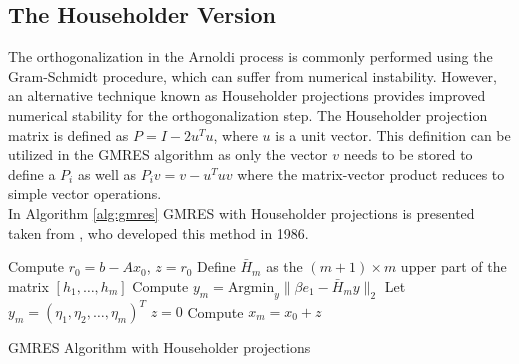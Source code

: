 \documentclass{article}
\begin{document}
\subsection{The Householder Version}
The orthogonalization in the Arnoldi process is commonly performed using the Gram-Schmidt procedure, which can suffer from numerical instability. However, an alternative technique known as Householder projections provides improved numerical stability for the orthogonalization step. The Householder projection matrix is defined as $P = I - 2u^Tu$, where $u$ is a unit vector. This definition can be utilized in the GMRES algorithm as only the vector $v$ needs to be stored to define a $P_i$ as well as $P_iv = v-u^Tuv$ where the matrix-vector product reduces to simple vector operations.\\
In Algorithm \ref{alg:gmres} GMRES with Householder projections is presented taken from \cite{saad}, who developed this method in 1986.\\
\begin{algorithm}[h]
\LinesNumbered
\SetAlgoLined
{}


Compute $r_0 = b - Ax_0$, $z = r_0$\;
Define $\bar{H}_m$ as the $(m+1) \times m$ upper part of the matrix $[h_1, \ldots, h_m]$\;
Compute $y_m = \text{Argmin}_y \lVert \beta e_1 - \bar{H}_my \rVert_2$\;
Let $y_m = (\eta_1, \eta_2, \ldots, \eta_m)^T$\;
$z = 0$\;
Compute $x_m = x_0 + z$\;

\caption{GMRES Algorithm with Householder projections}\label{alg:gmres}
\end{algorithm}
\end{document}

